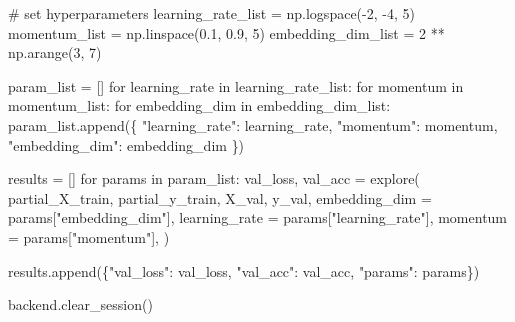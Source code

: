 \documentclass[
  letterpaper,
  DIV=11,
  numbers=noendperiod]{scrreprt}
\newenvironment{Shaded}{\begin{snugshade}}{\end{snugshade}}
\newcommand{\CommentTok}[1]{\textcolor[rgb]{0.37,0.37,0.37}{#1}}
\newcommand{\ControlFlowTok}[1]{\textcolor[rgb]{0.00,0.23,0.31}{#1}}
\newcommand{\DecValTok}[1]{\textcolor[rgb]{0.68,0.00,0.00}{#1}}
\newcommand{\FloatTok}[1]{\textcolor[rgb]{0.68,0.00,0.00}{#1}}
\newcommand{\KeywordTok}[1]{\textcolor[rgb]{0.00,0.23,0.31}{#1}}
\newcommand{\NormalTok}[1]{\textcolor[rgb]{0.00,0.23,0.31}{#1}}
\newcommand{\OperatorTok}[1]{\textcolor[rgb]{0.37,0.37,0.37}{#1}}
\newcommand{\StringTok}[1]{\textcolor[rgb]{0.13,0.47,0.30}{#1}}
\begin{document}
\begin{Shaded}
\begin{Highlighting}[]
\CommentTok{\# set hyperparameters}
\NormalTok{learning\_rate\_list  }\OperatorTok{=}\NormalTok{ np.logspace(}\OperatorTok{{-}}\DecValTok{2}\NormalTok{, }\OperatorTok{{-}}\DecValTok{4}\NormalTok{, }\DecValTok{5}\NormalTok{)}
\NormalTok{momentum\_list       }\OperatorTok{=}\NormalTok{ np.linspace(}\FloatTok{0.1}\NormalTok{, }\FloatTok{0.9}\NormalTok{, }\DecValTok{5}\NormalTok{)}
\NormalTok{embedding\_dim\_list  }\OperatorTok{=} \DecValTok{2} \OperatorTok{**}\NormalTok{ np.arange(}\DecValTok{3}\NormalTok{, }\DecValTok{7}\NormalTok{)}

\NormalTok{param\_list }\OperatorTok{=}\NormalTok{ []}
\ControlFlowTok{for}\NormalTok{ learning\_rate }\KeywordTok{in}\NormalTok{ learning\_rate\_list:}
    \ControlFlowTok{for}\NormalTok{ momentum }\KeywordTok{in}\NormalTok{ momentum\_list:}
        \ControlFlowTok{for}\NormalTok{ embedding\_dim }\KeywordTok{in}\NormalTok{ embedding\_dim\_list:}
\NormalTok{            param\_list.append(\{}
                \StringTok{"learning\_rate"}\NormalTok{: learning\_rate,}
                \StringTok{"momentum"}\NormalTok{: momentum,}
                \StringTok{"embedding\_dim"}\NormalTok{: embedding\_dim}
\NormalTok{            \})}
\end{Highlighting}
\end{Shaded}

\begin{Shaded}
\begin{Highlighting}[]
\NormalTok{results }\OperatorTok{=}\NormalTok{ []}
\ControlFlowTok{for}\NormalTok{ params }\KeywordTok{in}\NormalTok{ param\_list:}
\NormalTok{    val\_loss, val\_acc }\OperatorTok{=}\NormalTok{ explore(}
\NormalTok{        partial\_X\_train, }
\NormalTok{        partial\_y\_train,}
\NormalTok{        X\_val,}
\NormalTok{        y\_val,}
\NormalTok{        embedding\_dim }\OperatorTok{=}\NormalTok{ params[}\StringTok{"embedding\_dim"}\NormalTok{],}
\NormalTok{        learning\_rate }\OperatorTok{=}\NormalTok{ params[}\StringTok{"learning\_rate"}\NormalTok{],}
\NormalTok{        momentum }\OperatorTok{=}\NormalTok{ params[}\StringTok{"momentum"}\NormalTok{],}
\NormalTok{    )}
    
\NormalTok{    results.append(\{}\StringTok{"val\_loss"}\NormalTok{: val\_loss,}
                    \StringTok{"val\_acc"}\NormalTok{: val\_acc,}
                    \StringTok{"params"}\NormalTok{: params\})}

\NormalTok{    backend.clear\_session()}
\end{Highlighting}
\end{Shaded}
\end{document}
